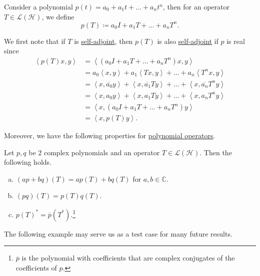 \begin{definition}\label{def:polynomial-op}
	Consider a polynomial \(p(t) = a_0 + a_1 t + \ldots  + a_n t^n\), then for an operator \(T\in \mathcal{L} (\mathcal{H} )\), we define
	\[
		p(T) \coloneqq a_0 I + a_1 T + \ldots  + a_n T^n.
	\]
\end{definition}

We first note that if \(T\) is \hyperref[def:self-adjoint-op]{self-adjoint}, then \(p(T)\) is also \hyperref[def:self-adjoint-op]{self-adjoint} if \(p\) is real since
\[
	\begin{split}
		\left\langle p(T) x, y \right\rangle
		&= \left\langle (a_0 I + a_1 T + \ldots  + a_n T^n)x, y \right\rangle \\
		&= a_0 \left\langle x, y \right\rangle + a_1 \left\langle Tx, y \right\rangle + \ldots + a_n \left\langle T^n x, y \right\rangle \\
		&= \left\langle x, \overline{a_0} y \right\rangle + \left\langle x, \overline{a_1}Ty \right\rangle + \ldots + \left\langle x, \overline{a_n}T^n y \right\rangle \\
		&= \left\langle x, a_0 y \right\rangle + \left\langle x, a_1 Ty \right\rangle + \ldots + \left\langle x, a_n T^n y \right\rangle \\
		&= \left\langle x, (a_0 I + a_1 T + \ldots + a_n T^n) y \right\rangle \\
		&= \left\langle x, p(T)y \right\rangle.
	\end{split}
\]

Moreover, we have the following properties for \hyperref[def:polynomial-op]{polynomial operators}.

\begin{proposition}\label{prop:polynomial-op}
	Let \(p, q\) be \(2\) complex polynomials and an operator \(T\in \mathcal{L} (\mathcal{H} )\). Then the following holds.
	\begin{enumerate}[(a)]
		\item \((ap + bq)(T) = ap(T) + bq(T)\) for \(a, b\in \mathbb{C} \).
		\item \((pq)(T) = p(T) q(T)\).
		\item \(p(T)^{\ast} = \overline{p} (T^{\ast} )\).\footnote{\(\overline{p} \) is the polynomial with coefficients that are complex conjugates of the coefficients of \(p\).}
	\end{enumerate}
\end{proposition}

The following example may serve us as a test case for many future results.

